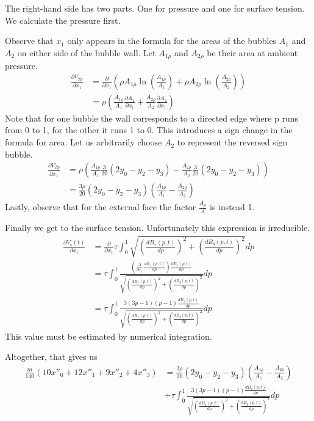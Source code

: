 \documentclass{article}
\begin{document}
The right-hand side has two parts. One for pressure and one for surface tension. We
calculate the pressure first. 

Observe that $x_1$ only appears in the formula for the areas of the bubbles
$A_1$ and $A_2$ on either side of the bubble wall. Let $A_{1\rho}$ and
$A_{2\rho}$ be their area at ambient pressure. 
\begin{align*}
\frac{\partial V_{Tp}}{\partial x_1} &= \frac{\partial }{\partial x_1}
\left(
\rho A_{1\rho}
\ln\left(\frac{A_{1\rho}}{A_1}\right)
+\rho A_{2\rho}
\ln\left(\frac{A_{2\rho}}{A_2}\right)
\right)\\
&= 
\rho \left(
\frac{A_{1\rho}}{A_1} \frac{\partial A_1}{\partial x_1}
+\frac{A_{2\rho}}{A_2} \frac{\partial A_2}{\partial x_1}
\right)
\end{align*}
Note that for one bubble the wall corresponds to a directed edge where p runs
from 0 to 1, for the other it runs 1 to 0. This introduces a sign change in the
formula for area. Let us arbitrarily choose $A_2$ to represent the reversed sign
bubble.
\begin{align*}
\frac{\partial V_{Tp}}{\partial x_1} &= 
\rho \left(
\frac{A_{1\rho}}{A_1} \frac{3}{20}(2y_0-y_2-y_3)
-\frac{A_{2\rho}}{A_2} \frac{3}{20}(2y_0-y_2-y_3)
\right)\\
&= 
 \frac{3\rho}{20} (2y_0-y_2-y_3)
\left( \frac{A_{1\rho}}{A_1} -\frac{A_{2\rho}}{A_2}\right)
\end{align*}
Lastly, observe that for the external face the factor $\frac{A_{\rho}}{A}$ is
instead 1.

Finally we get to the surface tension. Unfortunately this expression is
irreducible.
\begin{align*}
\frac{\partial V_s(t)}{\partial x_1}&=
\frac{\partial}{\partial x_1}
\tau \int_0^1 \sqrt{\left(\frac{d B_x(p,t)}{dp}\right)^2+\left(\frac{d
B_y(p,t)}{dp}\right)^2} dp\\
&=
\tau\int_0^1\frac{\left(\frac{\partial}{\partial x_1}\frac{d
B_x(p,t)}{dp}\right) \frac{d B_x(p,t)}{dp}}{
  \sqrt{\left(\frac{d B_x(p,t)}{dp}\right)^2+\left(\frac{d
B_y(p,t)}{dp}\right)^2}} dp\\
&=
\tau\int_0^1\frac{3(3p-1)(p-1)  \frac{d B_x(p,t)}{dp}}{
  \sqrt{\left(\frac{d B_x(p,t)}{dp}\right)^2+\left(\frac{d
B_y(p,t)}{dp}\right)^2}} dp
\end{align*}
This value must be estimated by numerical integration.

Altogether, that gives us
\begin{align}
\frac{m}{140} \left(10x''_0+12x''_1+9x''_2+4x''_3 \right) &= 
 \frac{3\rho}{20} (2y_0-y_2-y_3)
\left( \frac{A_{1\rho}}{A_1} -\frac{A_{2\rho}}{A_2}\right)\\
&+\tau\int_0^1\frac{3(3p-1)(p-1)  \frac{d B_x(p,t)}{dp}}{
  \sqrt{\left(\frac{d B_x(p,t)}{dp}\right)^2+\left(\frac{d
B_y(p,t)}{dp}\right)^2}} dp \nonumber
\end{align}
\end{document}
